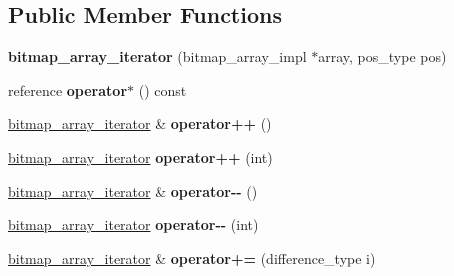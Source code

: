 \subsection*{Public Member Functions}
\begin{DoxyCompactItemize}
\item 
\mbox{\label{classdialog_1_1bitmap__array__iterator_a150d142a00b355f4215e85e4a9b59e3b}} 
{\bfseries bitmap\+\_\+array\+\_\+iterator} (bitmap\+\_\+array\+\_\+impl $\ast$array, pos\+\_\+type pos)
\item 
\mbox{\label{classdialog_1_1bitmap__array__iterator_ad36d311e3de7ea61e6a2ca4f95ac9b3a}} 
reference {\bfseries operator$\ast$} () const
\item 
\mbox{\label{classdialog_1_1bitmap__array__iterator_aa465184769a8ddb09aa0bccff98ede64}} 
\hyperlink{classdialog_1_1bitmap__array__iterator}{bitmap\+\_\+array\+\_\+iterator} \& {\bfseries operator++} ()
\item 
\mbox{\label{classdialog_1_1bitmap__array__iterator_ae67c4ecf86cfdc81c9708774d303c83c}} 
\hyperlink{classdialog_1_1bitmap__array__iterator}{bitmap\+\_\+array\+\_\+iterator} {\bfseries operator++} (int)
\item 
\mbox{\label{classdialog_1_1bitmap__array__iterator_a47b40b609780a709403ae34cbe3c229e}} 
\hyperlink{classdialog_1_1bitmap__array__iterator}{bitmap\+\_\+array\+\_\+iterator} \& {\bfseries operator-\/-\/} ()
\item 
\mbox{\label{classdialog_1_1bitmap__array__iterator_acfe196d8edfa16f3aa8002c982c94ac3}} 
\hyperlink{classdialog_1_1bitmap__array__iterator}{bitmap\+\_\+array\+\_\+iterator} {\bfseries operator-\/-\/} (int)
\item 
\mbox{\label{classdialog_1_1bitmap__array__iterator_adefd06d5b695d87812f1239b5e4c8885}} 
\hyperlink{classdialog_1_1bitmap__array__iterator}{bitmap\+\_\+array\+\_\+iterator} \& {\bfseries operator+=} (difference\+\_\+type i)
\item 

\end{DoxyCompactItemize}
